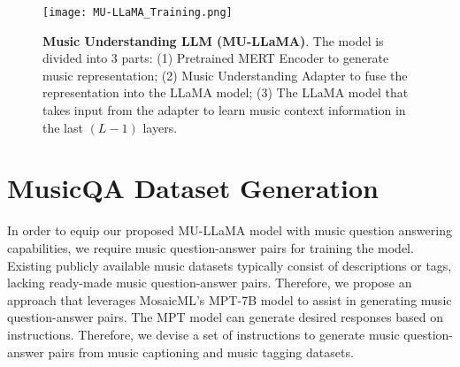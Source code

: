 \documentclass{article}
\begin{document}
\begin{figure*}
\centering
\texttt{[image: MU-LLaMA\_Training.png]}
\caption{\textbf{Music Understanding LLM (MU-LLaMA)}. The model is divided into 3 parts:
(1) Pretrained MERT Encoder to generate music representation;
(2) Music Understanding Adapter to fuse the representation into the LLaMA model;
(3) The LLaMA model that takes input from the adapter to learn music context information in the last $(L-1)$ layers.}
\label{mu-llama}
\end{figure*}

\vspace{-0.2cm}
\section{MusicQA Dataset Generation}
\label{sec:musicqa}
\vspace{-0.2cm}

\noindent
In order to equip our proposed MU-LLaMA model with music question answering capabilities, we require music question-answer pairs for training the model. Existing publicly available music datasets typically consist of descriptions or tags, lacking ready-made music question-answer pairs. Therefore, we propose an approach that leverages MosaicML's MPT-7B model \cite{MosaicML2023Introducing} to assist in generating music question-answer pairs. The MPT model can generate desired responses based on instructions. Therefore, we devise a set of instructions to generate music question-answer pairs from music captioning and music tagging datasets.
\end{document}
